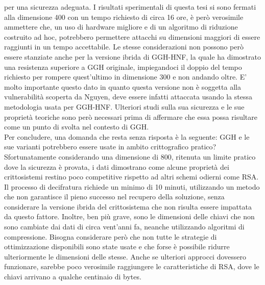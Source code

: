 per una sicurezza adeguata. I risultati sperimentali di questa tesi si sono fermati alla 
dimensione 400 con un tempo richiesto di circa 16 ore, è però verosimile ammettere che, 
un uso di hardware migliore e di un algoritmo di riduzione costruito ad hoc, potrebbero permettere
attacchi su dimensioni maggiori di essere raggiunti in un tempo accettabile. Le stesse 
considerazioni non possono però essere stanziate anche per la versione ibrida di GGH-HNF, la 
quale ha dimostrato una resistenza superiore a GGH originale, impiegandoci il doppio del 
tempo richiesto per rompere quest'ultimo in dimensione 300 e non andando oltre. E' molto 
importante questo dato in quanto questa versione non è
soggetta alla vulnerabilità scoperta da Nguyen, deve essere infatti attaccata usando la stessa 
metodologia usata per GGH-HNF. Ulteriori studi sulla sua sicurezza e le sue proprietà 
teoriche sono però necessari prima di affermare che essa possa risultare come un punto 
di svolta nel contesto di GGH.\\ Per concludere, una domanda che resta senza risposta è la seguente: 
GGH e le sue varianti potrebbero essere usate in ambito crittografico pratico? Sfortunatamente
considerando una dimensione di 800, ritenuta un limite pratico dove la sicurezza è provata, 
i dati dimostrano come 
alcune proprietà dei crittosistemi restino poco competitive rispetto ad altri schemi odierni 
come RSA. Il processo di decifratura richiede un minimo di 10 minuti, 
utilizzando un metodo che non garantisce il pieno successo nel recupero della soluzione, 
senza considerare la versione ibrida del crittosistema 
che non risulta essere impattata da questo fattore. Inoltre, ben più grave, sono le dimensioni delle
chiavi che non sono cambiate dai dati di circa vent'anni fa, neanche utilizzando algoritmi 
di compressione. Bisogna considerare però che non tutte le strategie di ottimizzazione 
disponibili sono state usate e che forse è possibile ridurre ulteriormente le 
dimensioni delle stesse. Anche se ulteriori approcci dovessero funzionare, sarebbe poco 
verosimile raggiungere le caratteristiche di RSA, dove le chiavi arrivano a qualche centinaio di bytes. 
